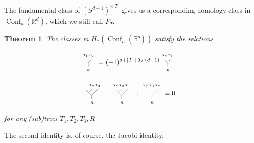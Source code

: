 \documentclass{shortart}
\newtheorem{thm}{Theorem}[section]
\theoremstyle{definition}
\DeclareMathOperator\Conf{Conf}
\newcommand\R{\mathbb{R}}
\begin{document}
The fundamental class of $(S^{d - 1})^{\times |T|}$ gives us a corresponding homology class in $\Conf_n(\R^d)$, which we still call $P_T$.

\begin{thm}
  The classes in $H_*(\Conf_n(\R^d))$ satisfy the relations
  \begin{useimager}
    \[
      \begin{tikzpicture}[scale=0.3, baseline={([yshift=-.5ex]current bounding box.center)}]
        \draw (0, 0) -- (-0.5, 0.5) node [above=-0.05] {\tiny $T_1$};
        \draw (0, 0) -- (0.5, 0.5) node [above=-0.05] {\tiny $T_2$};
        \draw (0, 0) -- (0, -0.707) node [below=-0.05] {\tiny $R$};
      \end{tikzpicture}
      = (-1)^{d + |T_1| |T_2| (d - 1)}
      \begin{tikzpicture}[scale=0.3, baseline={([yshift=-.5ex]current bounding box.center)}]
        \draw (0, 0) -- (-0.5, 0.5) node [above=-0.05] {\tiny $T_2$};
        \draw (0, 0) -- (0.5, 0.5) node [above=-0.05] {\tiny $T_1$};
        \draw (0, 0) -- (0, -0.707) node [below=-0.05] {\tiny $R$};
      \end{tikzpicture}
    \]
  \end{useimager}
  \begin{useimager}
    \[
      \begin{tikzpicture}[scale=0.3, baseline={([yshift=-.5ex]current bounding box.center)}]
        \draw (0, 0) -- (-1, 1) node [above=-0.05] {\tiny $T_1$};
        \draw (-0.5, 0.5) -- (0, 1) node [above=-0.05] {\tiny $T_2$};
        \draw (0, 0) -- (1, 1) node [above=-0.05] {\tiny $T_3$};
        \draw (0, 0) -- (0, -0.707) node [below=-0.05] {\tiny $R$};
      \end{tikzpicture}
      +
      \begin{tikzpicture}[scale=0.3, baseline={([yshift=-.5ex]current bounding box.center)}]
        \draw (0, 0) -- (-1, 1) node [above=-0.05] {\tiny $T_2$};
        \draw (-0.5, 0.5) -- (0, 1) node [above=-0.05] {\tiny $T_3$};
        \draw (0, 0) -- (1, 1) node [above=-0.05] {\tiny $T_1$};
        \draw (0, 0) -- (0, -0.707) node [below=-0.05] {\tiny $R$};
      \end{tikzpicture}
      +
      \begin{tikzpicture}[scale=0.3, baseline={([yshift=-.5ex]current bounding box.center)}]
        \draw (0, 0) -- (-1, 1) node [above=-0.05] {\tiny $T_3$};
        \draw (-0.5, 0.5) -- (0, 1) node [above=-0.05] {\tiny $T_1$};
        \draw (0, 0) -- (1, 1) node [above=-0.05] {\tiny $T_2$};
        \draw (0, 0) -- (0, -0.707) node [below=-0.05] {\tiny $R$};
      \end{tikzpicture}
      = 0
    \]
  \end{useimager}
  for any (sub)trees $T_1, T_2, T_3, R$
\end{thm}
The second identity is, of course, the Jacobi identity.
\end{document}
